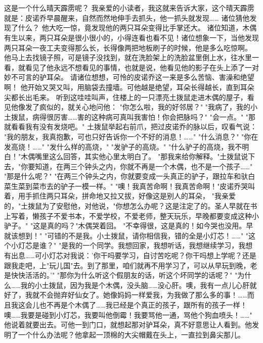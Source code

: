 \documentclass[12pt,UTF8]{ctexbook}
\begin{document}
\chapter{}

这是一个什么晴天霹雳呢？
我亲爱的小读者，我这就来告诉大家，这个晴天霹雳就是：皮诺乔早晨醒来，自然而然地伸手去抓头，他一抓头就发现……
诸位猜他发现了什么？
他大吃一惊，竟发现他的两只耳朵变得比手掌还大。
诸位知道，木偶有生以来，两只耳朵是很小很小的，小得连看也看不见！诸位想象一下，当他发现两只耳朵一夜工夫变得那么长，长得像两把地板刷子的时候，他是多么吃惊啊。
他马上去找镜子照，可是镜子没找到，就在洗脸架上的洗脸盆里倒上水，往水里一看，就看见了他永远不想看见的事情，也就是说，他看见他的影子在头上添了一对妙不可言的驴耳朵。
请诸位想想，可怜的皮诺乔这一来是多么苦恼、害澡和绝望啊！
他开始又哭又叫，用脑袋去撞墙。可他越是绝望，耳朵长得越长，直到耳朵尖都长出毛来。
听到这哇哇叫声，住楼上的一只漂亮土拨鼠走进木偶的屋子，看见他像发了疯似的，就关心地问他：
"你怎么啦，我的好邻居？"
"我病了，我的小土拨鼠，病得很厉害……害的这种病可真叫我害怕！你会把脉吗？"
"会一点。"
"那就看看我有没有发烧吧。"
土拨鼠举起右前爪，把过皮诺乔的脉以后，叹看气说：
"我的朋友，我真抱歉，可也只好告诉你一个不好的消息！……"
"什么消息？"
"你在发高烧！……"
"发什么样的高烧，"
"发驴子的高烧。"
"什么驴子的高烧，我不明白！"木偶嘴里这么回答，其实他心里太明白了。
"那我来给你解释。"土拨鼠说下去，"你要知道，在两三个钟头之内，你就不再是一个木偶，也不是一个孩子……"
"那是什么呢？"
"在两三个钟头之内，你就要变成一头真正的驴子，跟拉车和驮白菜生菜到菜市去的驴子一模一样。"
"噢！我真苦命啊！我真苦命啊！"皮诺乔哭叫着，用手抓住两只耳朵，拼命地又拉又拔，好像这是别人的耳朵，
"我亲爱的，"土拨鼠为了安慰他，对他说，"你想怎么办呢？这是注定了的。圣人早就在书上写着，懒孩子不爱书本，不爱学校，不爱老师，整天玩乐，早晚都要变成这种小驴子。"
"这是真的吗？"木偶哭着回。
"不幸得很，这是真的！如今哭也没用。早就该想到！"
"可错的不是我。小土拨鼠，请你相信我，错的全是小灯芯！……"
"这个小灯芯是谁？"
"是我的一个同学。我想回家，我想听话，我想继续学习，我想有出息……可小灯芯对我说：'你干吗要学习，自讨苦吃呢？你干吗想上学呢？还是跟我走吧，上"玩儿国"去。到了那里，咱们就再不用学习了，可以从早玩到晚，老是快快活活的。'"
"那你为什么听这个假朋友的话，听这个坏同学的话呢？"
"为什么……我的小土拨鼠，因为我是个木偶，没头脑……没心肝。噢，我有一点儿心肝就好了，我就不会抛弃好仙女了。她像妈妈一样爱我，为我做了那么多的事！……而且我这会儿也不再是个木偶了……我已经是个真正的孩子，跟所有的孩子一样！噢……我要是碰到小灯芯，我要叫他倒霉！我要骂他一通，骂他个狗血喷头！……"
他说着就要出去。可他一到门口，就想起那对驴耳朵，真不好意思让人看到。他发明了一个什么办法呢？他拿起一顶棉的大尖帽戴在头上，一直拉到鼻尖那儿。
\end{document}
